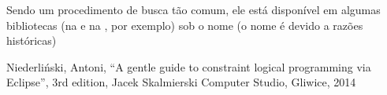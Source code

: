 \documentclass{article}
\begin{document}
\inputminted{prolog}{../Exemplos/Cap10/prog4_busca.ecl}

Sendo um procedimento de busca tão comum, ele está disponível em algumas bibliotecas \eclipse (na
 e na , por exemplo) sob o nome  (o nome
 é devido a razões históricas)



  \begin{thebibliography}{2}

    Niederliński, Antoni,
    ``A gentle guide to constraint logical programming via Eclipse'',
    3rd edition, Jacek Skalmierski Computer Studio, Gliwice, 2014

  \end{thebibliography}
\end{document}
